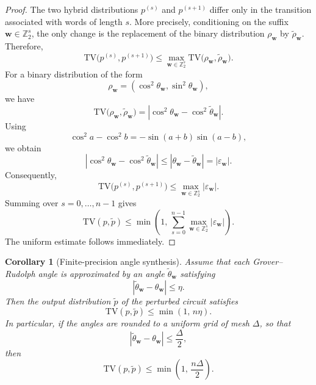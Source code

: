\documentclass{article}
\newtheorem{corollary}[theorem]{Corollary}
\numberwithin{equation}{section}
\begin{document}
\begin{proof}
The two hybrid distributions \(p^{(s)}\) and \(p^{(s+1)}\) differ only in
the transition associated with words of length \(s\). More precisely,
conditioning on the suffix
\(\mathbf w\in\mathbb Z_2^s\), the only change is the replacement of the
binary distribution \(\rho_{\mathbf w}\) by
\(\widetilde\rho_{\mathbf w}\). Therefore,
\[
\mathrm{TV}\bigl(p^{(s)},p^{(s+1)}\bigr)
\le
\max_{\mathbf w\in\mathbb Z_2^s}
\mathrm{TV}
\bigl(\rho_{\mathbf w},\widetilde\rho_{\mathbf w}\bigr).
\]
For a binary distribution of the form
\[
\rho_{\mathbf w}
=
(\cos^2\theta_{\mathbf w},\sin^2\theta_{\mathbf w}),
\]
we have
\[
\mathrm{TV}
\bigl(\rho_{\mathbf w},\widetilde\rho_{\mathbf w}\bigr)
=
\left|
\cos^2\theta_{\mathbf w}
-
\cos^2\widetilde\theta_{\mathbf w}
\right|.
\]
Using
\[
\cos^2 a-\cos^2 b
=
-\sin(a+b)\sin(a-b),
\]
we obtain
\[
\left|
\cos^2\theta_{\mathbf w}
-
\cos^2\widetilde\theta_{\mathbf w}
\right|
\le
|\theta_{\mathbf w}-\widetilde\theta_{\mathbf w}|
=
|\varepsilon_{\mathbf w}|.
\]
Consequently,
\[
\mathrm{TV}\bigl(p^{(s)},p^{(s+1)}\bigr)
\le
\max_{\mathbf w\in\mathbb Z_2^s}
|\varepsilon_{\mathbf w}|.
\]
Summing over \(s=0,\ldots,n-1\) gives
\[
\mathrm{TV}(p,\widetilde p)
\le
\min\!\left(1,\,
\sum_{s=0}^{n-1}
\max_{\mathbf w\in\mathbb Z_2^s}
|\varepsilon_{\mathbf w}|\right).
\]
The uniform estimate follows immediately.
\end{proof}

\begin{corollary}[Finite-precision angle synthesis]
\label{cor:finite_precision_angles}
Assume that each Grover--Rudolph angle is approximated by an angle
\(\widetilde\theta_{\mathbf w}\) satisfying
\[
|\widetilde\theta_{\mathbf w}-\theta_{\mathbf w}|
\le
\eta.
\]
Then the output distribution \(\widetilde p\) of the perturbed circuit
satisfies
\[
\mathrm{TV}(p,\widetilde p)
\le
\min(1,\,n\eta).
\]
In particular, if the angles are rounded to a uniform grid of mesh
\(\Delta\), so that
\[
|\widetilde\theta_{\mathbf w}-\theta_{\mathbf w}|
\le
\frac{\Delta}{2},
\]
then
\[
\mathrm{TV}(p,\widetilde p)
\le
\min\!\left(1,\,\frac{n\Delta}{2}\right).
\]
\end{corollary}
\end{document}
